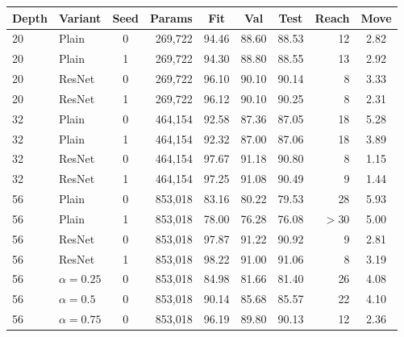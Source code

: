 \begin{tabular}{llcrcccrc}
\toprule
Depth & Variant & Seed & Params & Fit & Val & Test & Reach & Move \\
\midrule
20 & Plain & 0 & 269{,}722 & 94.46 & 88.60 & 88.53 & 12 & 2.82 \\
20 & Plain & 1 & 269{,}722 & 94.30 & 88.80 & 88.55 & 13 & 2.92 \\
20 & ResNet & 0 & 269{,}722 & 96.10 & 90.10 & 90.14 & 8 & 3.33 \\
20 & ResNet & 1 & 269{,}722 & 96.12 & 90.10 & 90.25 & 8 & 2.31 \\
32 & Plain & 0 & 464{,}154 & 92.58 & 87.36 & 87.05 & 18 & 5.28 \\
32 & Plain & 1 & 464{,}154 & 92.32 & 87.00 & 87.06 & 18 & 3.89 \\
32 & ResNet & 0 & 464{,}154 & 97.67 & 91.18 & 90.80 & 8 & 1.15 \\
32 & ResNet & 1 & 464{,}154 & 97.25 & 91.08 & 90.49 & 9 & 1.44 \\
56 & Plain & 0 & 853{,}018 & 83.16 & 80.22 & 79.53 & 28 & 5.93 \\
56 & Plain & 1 & 853{,}018 & 78.00 & 76.28 & 76.08 & $>$30 & 5.00 \\
56 & ResNet & 0 & 853{,}018 & 97.87 & 91.22 & 90.92 & 9 & 2.81 \\
56 & ResNet & 1 & 853{,}018 & 98.22 & 91.00 & 91.06 & 8 & 3.19 \\
56 & $\alpha=0.25$ & 0 & 853{,}018 & 84.98 & 81.66 & 81.40 & 26 & 4.08 \\
56 & $\alpha=0.5$ & 0 & 853{,}018 & 90.14 & 85.68 & 85.57 & 22 & 4.10 \\
56 & $\alpha=0.75$ & 0 & 853{,}018 & 96.19 & 89.80 & 90.13 & 12 & 2.36 \\
\bottomrule
\end{tabular}
